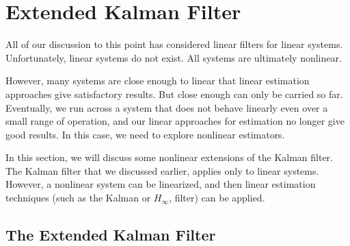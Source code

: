 \section{Extended Kalman Filter}
\label{extended_kalman_filter}

All of  our discussion to this point has considered linear filters for linear systems.
Unfortunately, linear systems do not  exist.  All systems are ultimately nonlinear.

However, many systems are  close enough to linear that linear estimation approaches give satisfactory results. 
But  close enough can only be carried so far.  Eventually, we run across a system 
that does not behave linearly even over a small range of  operation, and our linear 
approaches for  estimation  no longer give good results.  In this case, we  need  to  explore nonlinear estimators. 

In this section, we will discuss some nonlinear extensions of  the Kalman filter. 
The Kalman filter  that we  discussed earlier, applies only to 
linear  systems.  However,  a  nonlinear  system  can  be  linearized, and then  linear  estimation  techniques  (such  as the  Kalman  or  $H_{\infty}$, 
filter) can be applied.  





\subsection{The Extended Kalman Filter }
\label{extended_kalman_filter}


